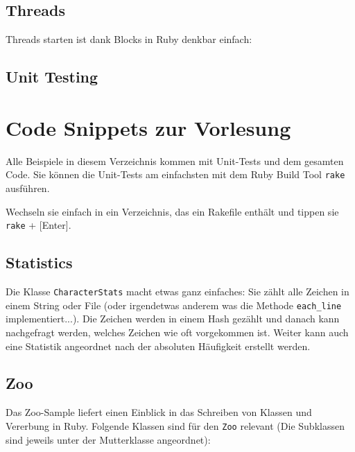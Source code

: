 \documentclass[a4book,11pt,twoside]{scrbook}
\begin{document}








\section{Threads} %
\label{sec:threads}
Threads starten ist dank Blocks in Ruby denkbar einfach:




\section{Unit Testing} %
\label{sec:unit_testing}











\chapter{Code Snippets zur Vorlesung}
Alle Beispiele in diesem Verzeichnis kommen mit Unit-Tests und dem gesamten Code. Sie können die Unit-Tests am einfachsten mit dem Ruby Build Tool \texttt{rake} ausführen.

Wechseln sie einfach in ein Verzeichnis, das ein Rakefile enthält und tippen sie \texttt{rake} + [Enter].

\section{Statistics} %
\label{sec:statistics}
Die Klasse \texttt{CharacterStats} macht etwas ganz einfaches: Sie zählt alle Zeichen in einem String oder File (oder irgendetwas anderem was die Methode \texttt{each\_line} implementiert...).
Die Zeichen werden in einem Hash gezählt und danach kann nachgefragt werden, welches Zeichen wie oft vorgekommen ist. Weiter kann auch eine Statistik angeordnet nach der absoluten Häufigkeit erstellt werden.


\section{Zoo} %
\label{sec:zoo}
Das Zoo-Sample liefert einen Einblick in das Schreiben von Klassen und Vererbung in Ruby. Folgende Klassen sind für den \texttt{Zoo} relevant (Die Subklassen sind jeweils unter der Mutterklasse angeordnet):
\end{document}

